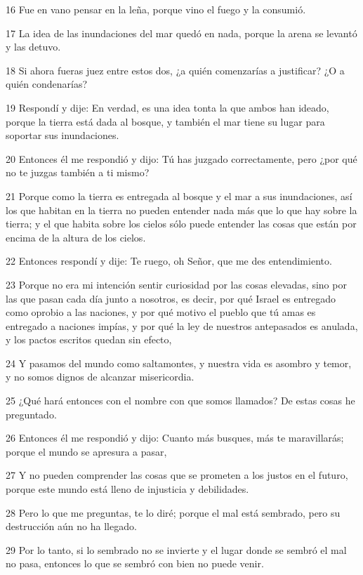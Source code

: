 \par 16 Fue en vano pensar en la leña, porque vino el fuego y la consumió.
\par 17 La idea de las inundaciones del mar quedó en nada, porque la arena se levantó y las detuvo.
\par 18 Si ahora fueras juez entre estos dos, ¿a quién comenzarías a justificar? ¿O a quién condenarías?
\par 19 Respondí y dije: En verdad, es una idea tonta la que ambos han ideado, porque la tierra está dada al bosque, y también el mar tiene su lugar para soportar sus inundaciones.
\par 20 Entonces él me respondió y dijo: Tú has juzgado correctamente, pero ¿por qué no te juzgas también a ti mismo?
\par 21 Porque como la tierra es entregada al bosque y el mar a sus inundaciones, así los que habitan en la tierra no pueden entender nada más que lo que hay sobre la tierra; y el que habita sobre los cielos sólo puede entender las cosas que están por encima de la altura de los cielos.
\par 22 Entonces respondí y dije: Te ruego, oh Señor, que me des entendimiento.
\par 23 Porque no era mi intención sentir curiosidad por las cosas elevadas, sino por las que pasan cada día junto a nosotros, es decir, por qué Israel es entregado como oprobio a las naciones, y por qué motivo el pueblo que tú amas es entregado a naciones impías, y por qué la ley de nuestros antepasados ​​es anulada, y los pactos escritos quedan sin efecto,
\par 24 Y pasamos del mundo como saltamontes, y nuestra vida es asombro y temor, y no somos dignos de alcanzar misericordia.
\par 25 ¿Qué hará entonces con el nombre con que somos llamados? De estas cosas he preguntado.
\par 26 Entonces él me respondió y dijo: Cuanto más busques, más te maravillarás; porque el mundo se apresura a pasar,
\par 27 Y no pueden comprender las cosas que se prometen a los justos en el futuro, porque este mundo está lleno de injusticia y debilidades.
\par 28 Pero lo que me preguntas, te lo diré; porque el mal está sembrado, pero su destrucción aún no ha llegado.
\par 29 Por lo tanto, si lo sembrado no se invierte y el lugar donde se sembró el mal no pasa, entonces lo que se sembró con bien no puede venir.
